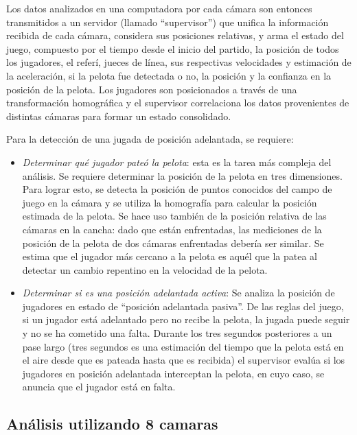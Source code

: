 \documentclass[a4paper,10pt]{article}
\begin{document}
Los datos analizados en una computadora por cada cámara son entonces transmitidos
a un servidor (llamado ``supervisor'') que unifica la información recibida de
cada cámara, considera sus posiciones relativas, y arma el estado del juego,
compuesto por el tiempo desde el inicio del partido, la posición de todos los
jugadores, el referí, jueces de línea, sus respectivas velocidades y estimación
de la aceleración, si la pelota fue detectada o no, la posición y la confianza
en la posición de la pelota. Los jugadores son posicionados a través de una
transformación homográfica y el supervisor correlaciona los datos provenientes
de distintas cámaras para formar un estado consolidado.

Para la detección de una jugada de posición adelantada, se requiere:

\begin{itemize}

  \item \textit{Determinar qué jugador pateó la pelota}: esta es la tarea más
    compleja del análisis. Se requiere determinar la posición de la pelota en
    tres dimensiones. Para lograr esto, se detecta la posición de puntos
    conocidos del campo de juego en la cámara y se utiliza la homografía para
    calcular la posición estimada de la pelota. Se hace uso también de la
    posición relativa de las cámaras en la cancha: dado que están enfrentadas,
    las mediciones de la posición de la pelota de dos cámaras enfrentadas
    debería ser similar. Se estima que el jugador más cercano a la pelota es
    aquél que la patea al detectar un cambio repentino en la velocidad de la
    pelota.

  \item \textit{Determinar si es una posición adelantada activa}: Se analiza
    la posición de jugadores en estado de ``posición adelantada pasiva''. De
    las reglas del juego, si un jugador está adelantado pero no recibe la
    pelota, la jugada puede seguir y no se ha cometido una falta. Durante los
    tres segundos posteriores a un pase largo (tres segundos es una estimación
    del tiempo que la pelota está en el aire desde que es pateada hasta que es
    recibida) el supervisor evalúa si los jugadores en posición adelantada
    interceptan la pelota, en cuyo caso, se anuncia que el jugador está en
    falta.

\end{itemize}

\subsection{Análisis utilizando 8 camaras}
\label{sec:8-camaras}
\end{document}
